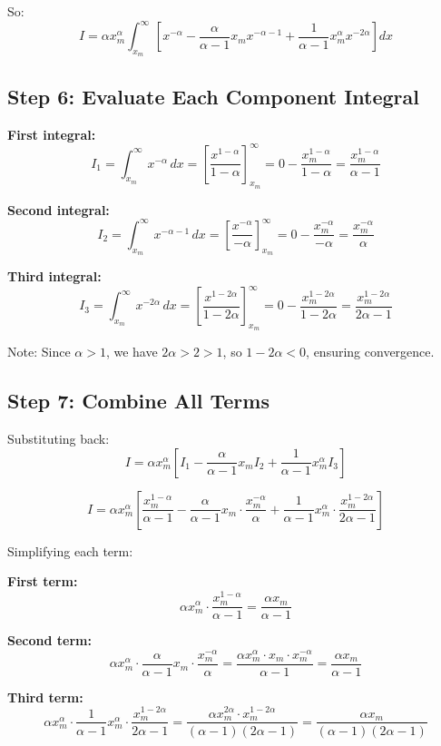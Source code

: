 \documentclass[12pt,a4paper]{article}
\theoremstyle{definition}
\begin{document}
So:
\[
I = \alpha x_m^\alpha \int_{x_m}^\infty \left[ x^{-\alpha} - \frac{\alpha}{\alpha - 1} x_m x^{-\alpha-1} + \frac{1}{\alpha - 1} x_m^\alpha x^{-2\alpha} \right] dx
\]

\subsection{Step 6: Evaluate Each Component Integral}

\textbf{First integral:}
\[
I_1 = \int_{x_m}^\infty x^{-\alpha} \, dx = \left[ \frac{x^{1-\alpha}}{1-\alpha} \right]_{x_m}^\infty = 0 - \frac{x_m^{1-\alpha}}{1-\alpha} = \frac{x_m^{1-\alpha}}{\alpha - 1}
\]

\textbf{Second integral:}
\[
I_2 = \int_{x_m}^\infty x^{-\alpha-1} \, dx = \left[ \frac{x^{-\alpha}}{-\alpha} \right]_{x_m}^\infty = 0 - \frac{x_m^{-\alpha}}{-\alpha} = \frac{x_m^{-\alpha}}{\alpha}
\]

\textbf{Third integral:}
\[
I_3 = \int_{x_m}^\infty x^{-2\alpha} \, dx = \left[ \frac{x^{1-2\alpha}}{1-2\alpha} \right]_{x_m}^\infty = 0 - \frac{x_m^{1-2\alpha}}{1-2\alpha} = \frac{x_m^{1-2\alpha}}{2\alpha - 1}
\]

Note: Since $\alpha > 1$, we have $2\alpha > 2 > 1$, so $1-2\alpha < 0$, ensuring convergence.

\subsection{Step 7: Combine All Terms}

Substituting back:
\[
I = \alpha x_m^\alpha \left[ I_1 - \frac{\alpha}{\alpha - 1} x_m I_2 + \frac{1}{\alpha - 1} x_m^\alpha I_3 \right]
\]

\[
I = \alpha x_m^\alpha \left[ \frac{x_m^{1-\alpha}}{\alpha - 1} - \frac{\alpha}{\alpha - 1} x_m \cdot \frac{x_m^{-\alpha}}{\alpha} + \frac{1}{\alpha - 1} x_m^\alpha \cdot \frac{x_m^{1-2\alpha}}{2\alpha - 1} \right]
\]

Simplifying each term:

\textbf{First term:}
\[
\alpha x_m^\alpha \cdot \frac{x_m^{1-\alpha}}{\alpha - 1} = \frac{\alpha x_m}{\alpha - 1}
\]

\textbf{Second term:}
\[
\alpha x_m^\alpha \cdot \frac{\alpha}{\alpha - 1} x_m \cdot \frac{x_m^{-\alpha}}{\alpha} = \frac{\alpha x_m^\alpha \cdot x_m \cdot x_m^{-\alpha}}{\alpha - 1} = \frac{\alpha x_m}{\alpha - 1}
\]

\textbf{Third term:}
\[
\alpha x_m^\alpha \cdot \frac{1}{\alpha - 1} x_m^\alpha \cdot \frac{x_m^{1-2\alpha}}{2\alpha - 1} = \frac{\alpha x_m^{2\alpha} \cdot x_m^{1-2\alpha}}{(\alpha - 1)(2\alpha - 1)} = \frac{\alpha x_m}{(\alpha - 1)(2\alpha - 1)}
\]
\end{document}
